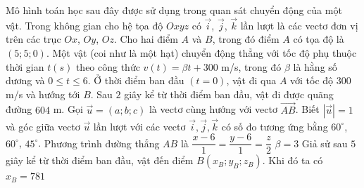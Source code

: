 
\begin{ex}%
	Mô hình toán học sau đây được sử dụng trong quan sát chuyển động của một vật. Trong không gian cho hệ tọa độ $Oxyz$ có $\overrightarrow{i}$, $\overrightarrow{j}$, $\overrightarrow{k}$ lần lượt là các vectơ đơn vị trên các trục $Ox$, $Oy$, $Oz$. Cho hai điểm $A$ và $B$, trong đó điểm $A$ có tọa độ là $(5;5;0)$. Một vật (coi như là một hạt) chuyển động thẳng với tốc độ phụ thuộc thời gian $t(s)$ theo công thức $v(t) = \beta t + 300$ m/s, trong đó $\beta$ là hằng số dương và $0 \le t \le 6$. Ở thời điểm ban đầu $(t=0)$, vật đi qua $A$ với tốc độ $300$ m/s và hướng tới $B$. Sau $2$ giây kể từ thời điểm ban đầu, vật đi được quãng đường $604$ m. Gọi $\overrightarrow{u}=(a;b;c)$ là vectơ cùng hướng với vectơ $\overrightarrow{AB}$. Biết $|\overrightarrow{u}|=1$ và góc giữa vectơ $\overrightarrow{u}$ lần lượt với các vectơ $\overrightarrow{i}, \overrightarrow{j}, \overrightarrow{k}$ có số đo tương ứng bằng $60^\circ$, $60^\circ$, $45^\circ$.
	{Phương trình đường thẳng $AB$ là $\dfrac{x-6}{1} = \dfrac{y-6}{1} = \dfrac{z}{2}$}
	{$\beta = 3$}
	{Giả sử sau $5$ giây kể từ thời điểm ban đầu, vật đến điểm $B(x_B; y_B; z_B)$. Khi đó ta có $x_B = 781$}
\end{ex}

